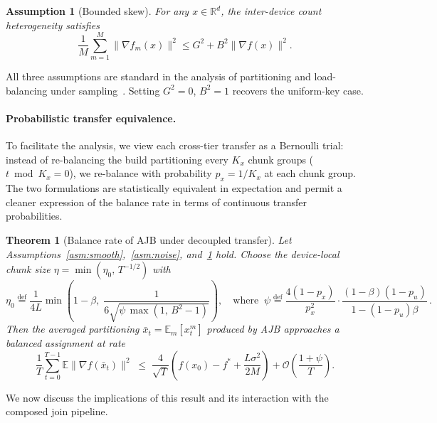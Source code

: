 \documentclass{article}
\newtheorem{assumption}{Assumption}
\newtheorem{theorem}{Theorem}
\begin{document}
\begin{assumption}[Bounded skew]
\label{asm:heterogeneity}
For any $x \in \mathbb{R}^d$, the inter-device count heterogeneity satisfies
\begin{equation}
\frac{1}{M} \sum_{m=1}^{M} \|\nabla f_m(x)\|^2 \leq G^2 + B^2
\|\nabla f(x)\|^2.
\end{equation}
\end{assumption}

All three assumptions are standard in the analysis of partitioning and
load-balancing under
sampling~\citep{karimireddy2020scaffold,wang2021field,DeWitt1992practical}.
Setting $G^2 = 0$, $B^2 = 1$ recovers the uniform-key case.

\paragraph{Probabilistic transfer equivalence.}
To facilitate the analysis, we view each cross-tier transfer as a Bernoulli
trial: instead of re-balancing the build partitioning every $K_x$ chunk groups
($t \bmod K_x = 0$), we re-balance with probability $p_x = 1/K_x$ at each chunk
group. The two formulations are statistically equivalent in expectation and
permit a cleaner expression of the balance rate in terms of continuous transfer
probabilities.

\begin{theorem}[Balance rate of AJB under decoupled transfer]
\label{thm:sgdm}
Let Assumptions~\ref{asm:smooth},~\ref{asm:noise}, and~\ref{asm:heterogeneity}
hold. Choose the device-local chunk size $\eta = \min(\eta_0,\, T^{-1/2})$ with
\begin{equation}
\eta_0 \stackrel{\mathrm{def}}{=}
\frac{1}{4L} \min\!\left(1 - \beta,\;
\frac{1}{6\sqrt{\psi\,\max(1,\, B^2 - 1)}}\right),
\quad \text{where}\;\;
\psi \stackrel{\mathrm{def}}{=}
\frac{4(1-p_x)}{p_x^2}
\cdot \frac{(1-\beta)(1-p_u)}{1-(1-p_u)\beta}\,.
\label{eq:step_size}
\end{equation}
Then the averaged partitioning $\bar{x}_t = \mathbb{E}_m[x^m_t]$ produced by AJB
approaches a balanced assignment at rate
\begin{equation}
\frac{1}{T}\sum_{t=0}^{T-1}
\mathbb{E}\|\nabla f(\bar{x}_t)\|^2
\;\leq\; \frac{4}{\sqrt{T}}
\left(f(x_0) - f^* + \frac{L\sigma^2}{2M}\right)
+ \mathcal{O}\!\left(\frac{1+\psi}{T}\right).
\label{eq:rate}
\end{equation}
\end{theorem}

We now discuss the implications of this result and its interaction with the
composed join pipeline.
\end{document}
